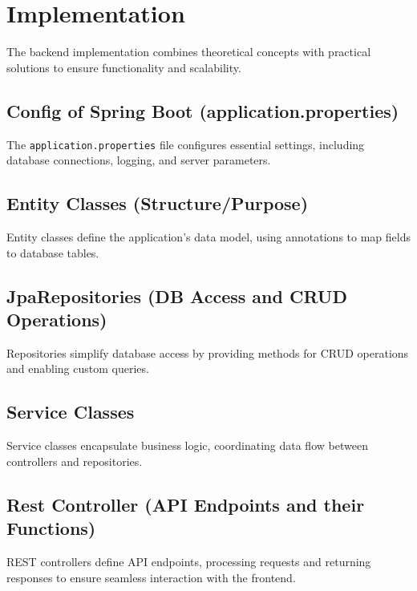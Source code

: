 \Author{\daAuthorThree}

\usepackage{amsmath}



    \section{Implementation}
    The backend implementation combines theoretical concepts with practical solutions to ensure functionality and scalability.

    \subsection{Config of Spring Boot (application.properties)}
    The \texttt{application.properties} file configures essential settings, including database connections, logging, and server parameters.

    \subsection{Entity Classes (Structure/Purpose)}
    Entity classes define the application's data model, using annotations to map fields to database tables.

    \subsection{JpaRepositories (DB Access and CRUD Operations)}
    Repositories simplify database access by providing methods for CRUD operations and enabling custom queries.

    \subsection{Service Classes}
    Service classes encapsulate business logic, coordinating data flow between controllers and repositories.

    \subsection{Rest Controller (API Endpoints and their Functions)}
    REST controllers define API endpoints, processing requests and returning responses to ensure seamless interaction with the frontend.


